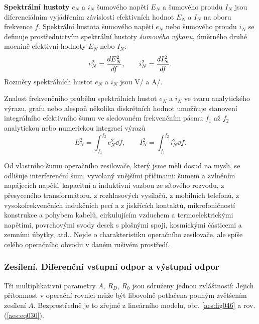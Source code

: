         \textbf{Spektrální hustoty} \(e_N\) a \(i_N\) šumového napětí \(E_N\) a šumového proudu
        \(I_N\) jsou diferenciálním vyjádřením závislosti efektivních hodnot \(E_N\) a \(I_N\) na
        oboru frekvence \(f\). Spektrální hustota šumového napětí \(e_N\) nebo šumového proudu \(i_N\)
        se definuje prostřednictvím spektrální hustoty \emph{šumového výkonu}, úměrného druhé mocnině
        efektivní hodnoty \(E_N\) nebo \(I_N\):
        \begin{equation}\label{aes:eq40}
          e_N^2 = \dfrac{d E_N^2}{d f}, \quad\quad i_N^2 = \dfrac{d I_N^2}{d f}.
        \end{equation}
        Rozměry spektrálních hustot \(e_N\) a \(i_N\) jsou \si[per-mode=symbol]
        {\V\per\sqrt{\Hz}} a \si[per-mode=symbol]{\A\per\sqrt{\Hz}}.

        Znalost frekvenčního průběhu spektrálních hustot \(e_N\) a \(i_N\) ve tvaru analytického
        výrazu, grafu nebo alespoň několika diskrétních hodnot umožňuje stanovení integrálního
        efektivního šumu ve sledovaném frekvenčním pásmu \(f_1\) až \(f_2\) analytickou nebo
        numerickou integrací výrazů
        \begin{equation}\label{aes:eq41}
          E_N^2 = \int_{f_1}^{f_2}{e_N^2}\dd{f}, \quad\quad I_N^2 = \int_{f_1}^{f_2}{i_N^2}\dd{f}.
        \end{equation}

        Od vlastního šumu operačního zesilovače, který jsme měli dosud na mysli, se odlišuje
        interferenční šum, vyvolaný vnějšími příčinami: šumem a zvlněním napájecích napětí, kapacitní
        a induktivní vazbou ze síťového rozvodu, z přesyceného transformátoru, z rozhlasových
        vysílačů, z mobilních telefonů, z vysokofrekvenčních indukčních pecí a z jiskřících kontaktů,
        mikrofoničností konstrukce a pohybem kabelů, cirkulujícím vzduchem a termoelektrickými
        napětími, povrchovými svody desek s plošnými spoji, kosmickými částicemi a zemními úbytky,
        atd.. Nejde o charakteristiku operačního zesilovače, ale spíše celého operačního obvodu v
        daném rušivém prostředí.

      \subsubsection{Zesílení. Diferenční vstupní odpor a výstupní odpor}\label{aesIchIIIsecIIssecV}
        Tři multiplikativní parametry \(A\), \(R_D\), \(R_0\) jsou sdruženy jednou zvláštností:
        Jejich přítomnost v operační rovnici může být libovolně potlačena pouhým zvětšením zesílení
        \(A\). Bezprostředně je to zřejmé z lineárního modelu, obr. \ref{aes:fig046} a rov.
        (\ref{aes:eq030}). 

